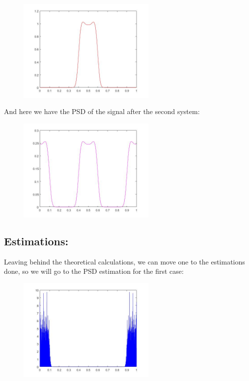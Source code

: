 \documentclass[a4paper,11pt]{article}
\begin{document}
\begin{figure}[!hp]
    \begin{center}
    \includegraphics[width=0.6\textwidth]{images/lab4_figure11.jpg}
    \end{center}
\end{figure}

And here we have the PSD of the signal after the second system:

\begin{figure}[!hp]
    \begin{center}
    \includegraphics[width=0.6\textwidth]{images/lab4_figure12.jpg}
    \end{center}
\end{figure}

\newpage

\subsection{Estimations:}

Leaving behind the theoretical calculations, we can move one to the estimations done, so we will go to the PSD estimation for the first case:

\begin{figure}[!hp]
    \begin{center}
    \includegraphics[width=0.6\textwidth]{images/lab4_figure7.jpg}
    \end{center}
\end{figure}
\end{document}
